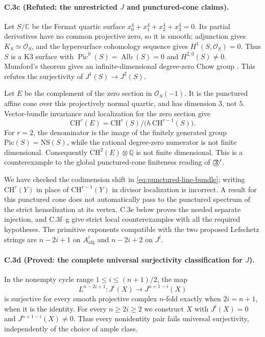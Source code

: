 \paragraph{C.3c (Refuted: the unrestricted $J$ and punctured-cone claims).}
Let $S/\mathbb C$ be the Fermat quartic surface
$x_0^4+x_1^4+x_2^4+x_3^4=0$. Its partial derivatives have no common
projective zero, so it is smooth; adjunction gives
$K_S\simeq\mathcal O_S$, and the hypersurface cohomology sequence gives
$H^1(S,\mathcal O_S)=0$. Thus $S$ is a K3 surface with
$\operatorname{Pic}^0(S)=\operatorname{Alb}(S)=0$ and
$H^{2,0}(S)\ne0$. Mumford's theorem gives an infinite-dimensional
degree-zero Chow group \citep[Section 2, main theorem, p.~200]{cyMumford1969}.
This refutes the surjectivity of $J^1(S)\to J^2(S)$.

Let $E$ be the complement of the zero section in
$\mathcal O_S(-1)$. It is the punctured affine cone over this projectively
normal quartic, and has dimension $3$, not $5$. Vector-bundle invariance
and localization for the zero section give
\begin{equation}\label{eq:punctured-line-bundle}
 \mathrm{CH}^r(E)=
 \mathrm{CH}^r(S)/\bigl(h\,\mathrm{CH}^{r-1}(S)\bigr).
\end{equation}
For $r=2$, the denominator is the image of the finitely generated group
$\mathrm{Pic}(S)=\mathrm{NS}(S)$, while the rational degree-zero numerator
is not finite dimensional. Consequently $\mathrm{CH}^2(E)\otimes\mathbb Q$
is not finite dimensional. This is a counterexample to the global
punctured-cone finiteness reading of $\text{\textcircled{3}}'$.

We have checked the codimension shift in
\eqref{eq:punctured-line-bundle}; writing $\mathrm{CH}^r(Y)$ in place of
$\mathrm{CH}^{r-1}(Y)$ in divisor localization is incorrect. A result for
this punctured cone does not automatically pass to the punctured
spectrum of the strict henselization at its vertex. C.3e below
proves the needed separate injection, and C.3f--g give strict local
counterexamples with all the required hypotheses.
The primitive exponents compatible with the two proposed Lefschetz
strings are $n-2i+1$ on $A^i_{\mathrm{alg}}$ and $n-2i+2$ on $J^i$.

\paragraph{C.3d (Proved: the complete universal surjectivity classification for $J$).}
In the nonempty cycle range $1\le i\le(n+1)/2$, the map
\[
 L^{n-2i+1}:J^i(X)\longrightarrow J^{n+1-i}(X)
\]
is surjective for every smooth projective complex $n$-fold exactly
when $2i=n+1$, when it is the identity. For every $n\ge2i\ge2$
we construct $X$ with $J^i(X)=0$ and $J^{n+1-i}(X)\ne0$.
Thus every nonidentity pair fails universal surjectivity, independently
of the choice of ample class.

